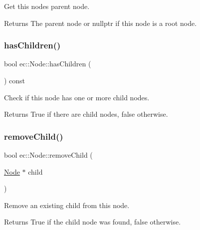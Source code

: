 Get this node\textquotesingle{}s parent node. 

\begin{DoxyReturn}{Returns}
The parent node or nullptr if this node is a root node. 
\end{DoxyReturn}
\mbox{\label{classec_1_1_node_ae1626b695c7c5f15af399772b51d0a5a}} 
\subsubsection{\texorpdfstring{has\+Children()}{hasChildren()}}
{\footnotesize\ttfamily bool ec\+::\+Node\+::has\+Children (\begin{DoxyParamCaption}{ }\end{DoxyParamCaption}) const}



Check if this node has one or more child nodes. 

\begin{DoxyReturn}{Returns}
True if there are child nodes, false otherwise. 
\end{DoxyReturn}
\mbox{\label{classec_1_1_node_ab0d856da4064db916e6fd4f9ad1ecafb}} 
\subsubsection{\texorpdfstring{remove\+Child()}{removeChild()}}
{\footnotesize\ttfamily bool ec\+::\+Node\+::remove\+Child (\begin{DoxyParamCaption}\item[{\mbox{\hyperlink{classec_1_1_node}{Node}} $\ast$}]{child }\end{DoxyParamCaption})}



Remove an existing child from this node. 

\begin{DoxyReturn}{Returns}
True if the child node was found, false otherwise. 
\end{DoxyReturn}
\mbox{\label{classec_1_1_node_a4d9f13d7482fe4612ec2cffa8a06cc00}} 
